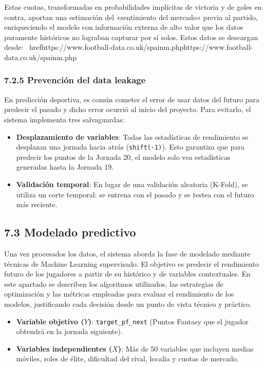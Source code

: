 Estas cuotas, transformadas en probabilidades 
 implícitas de victoria y de goles en contra, aportan una estimación del «sentimiento del mercado»
  previa al partido, enriqueciendo el modelo con información externa de alto valor que los datos
   puramente históricos no lograban capturar por sí solos. Estos datos se descargan desde: \
   href{https://www.football-data.co.uk/spainm.php}{https://\linebreak www.football-data.co.uk/spainm.php}
\subsubsection{7.2.5 Prevención del data leakage}
En predicción deportiva, es común cometer el error de usar datos del futuro
para predecir el pasado y dicho error ocurrió al inicio del proyecto. Para evitarlo, el sistema implementa tres
salvaguardas:

\begin{itemize}
\item \textbf{Desplazamiento de variables}: Todas las estadísticas de rendimiento se
desplazan una jornada hacia atrás (\texttt{shift(-1)}). Esto garantiza que para predecir los
puntos de la Jornada 20, el modelo solo vea estadísticas generadas hasta la
Jornada 19.
\item \textbf{Validación temporal}: En lugar de una validación aleatoria
(K-Fold), se utiliza un corte temporal: se entrena con el pasado y se testea
con el futuro más reciente.
\end{itemize}



\subsection{7.3 Modelado predictivo}
Una vez procesados los datos, el sistema aborda la fase de modelado mediante
técnicas de Machine Learning supervisado. El objetivo es predecir el rendimiento
futuro de los jugadores a partir de su histórico y de variables contextuales.
En este apartado se describen los algoritmos utilizados, las estrategias de
optimización y las métricas empleadas para evaluar el rendimiento de los
modelos, justificando cada decisión desde un punto de vista técnico y práctico.
\begin{itemize}
\item \textbf{Variable objetivo ($Y$)}: \texttt{target\_pf\_next} (Puntos Fantasy
que el jugador obtendrá en la jornada siguiente).
\item \textbf{Variables independientes ($X$)}: Más de 50 variables que incluyen
medias móviles, roles de élite, dificultad del rival, localía y cuotas de
mercado.
\end{itemize}

